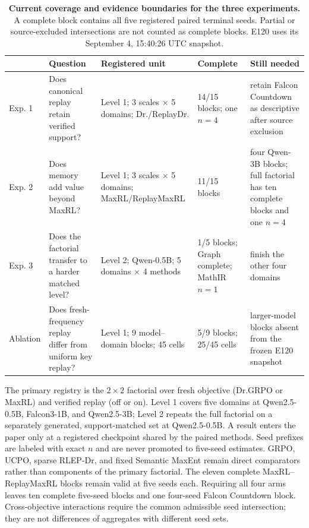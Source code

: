 \begin{table}[H]
  \centering
  \caption{\textbf{Current coverage and evidence boundaries for the three
  experiments.} A complete block contains all five registered paired
  terminal seeds. Partial or source-excluded intersections are not counted as complete blocks.
  E120 uses its September 4, 15:40:26 UTC snapshot.}
  \label{tab:experiment-map}
  \scriptsize
  \setlength{\tabcolsep}{3pt}
  \begin{tabularx}{\linewidth}{@{}P{.09\linewidth}P{.27\linewidth}P{.25\linewidth}P{.15\linewidth}Y@{}}
    \toprule
    & \textbf{Question} & \textbf{Registered unit} & \textbf{Complete} &
      \textbf{Still needed} \\
    \midrule
    Exp. 1 & Does canonical replay retain verified support? &
      Level 1; 3 scales $\times$ 5 domains; Dr./ReplayDr. &
      14/15 blocks; one $n=4$ & retain Falcon Countdown as descriptive after source exclusion \\
    Exp. 2 & Does memory add value beyond MaxRL? &
      Level 1; 3 scales $\times$ 5 domains; MaxRL/ReplayMaxRL &
      11/15 blocks & four Qwen-3B blocks; full factorial has ten complete blocks and one $n=4$ \\
    Exp. 3 & Does the factorial transfer to a harder matched level? &
      Level 2; Qwen-0.5B; 5 domains $\times$ 4 methods &
      1/5 blocks; Graph complete; MathIR \(n=1\) & finish the other four domains \\
    Ablation & Does fresh-frequency replay differ from uniform key replay? &
      Level 1; 9 model--domain blocks; 45 cells &
      5/9 blocks; 25/45 cells & larger-model blocks absent from the frozen E120 snapshot \\
    \bottomrule
  \end{tabularx}
\end{table}


The primary registry is the $2\times2$ factorial over fresh objective
(Dr.GRPO or MaxRL) and verified replay (off or on). Level 1 covers five domains
at Qwen2.5-0.5B, Falcon3-1B, and Qwen2.5-3B; Level 2 repeats the full factorial
on a separately generated, support-matched set at Qwen2.5-0.5B. A result enters
the paper only at a registered checkpoint shared by the paired methods. Seed
prefixes are labeled with exact $n$ and are never promoted to five-seed
estimates. GRPO, UCPO, sparse RLEP-Dr, and fixed Semantic MaxEnt remain direct
comparators rather than components of the primary factorial. The eleven complete
MaxRL--ReplayMaxRL blocks remain valid at five seeds each. Requiring all four
arms leaves ten complete five-seed blocks and one four-seed Falcon Countdown
block. Cross-objective interactions require the common admissible seed
intersection; they are not differences of aggregates with different seed sets.

